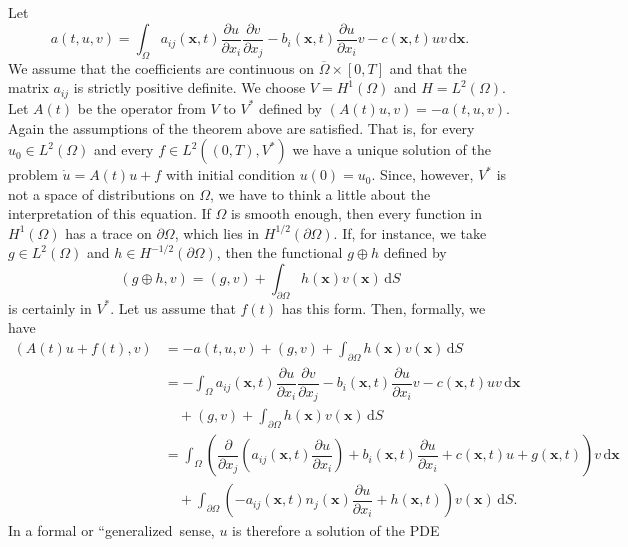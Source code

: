 \begin{Example}
\label{ex:parabolic-natural-boundary-problem}
Let
\begin{equation}\label{eq:parabolic-natural-boundary-quadratic-form}
a(t,u,v)=\int_\Omega a_{ij}(\bm{x},t)\dfrac{\partial u}{\partial x_i}\dfrac{\partial v}{\partial x_j}-b_i(\bm{x},t)\dfrac{\partial u}{\partial x_i}v-c(\bm{x},t)uv\,\mathrm{d}\bm{x}.
\end{equation}
We assume that the coefficients are continuous on $\overline\Omega\times[0,T]$ and that the matrix $a_{ij}$ is strictly positive definite. We choose $V=H^1(\Omega)$ and $H=L^2(\Omega)$. Let $A(t)$ be the operator from $V$ to $V^*$ defined by $(A(t)u,v)=-a(t,u,v)$. Again the assumptions of the theorem above are satisfied. That is, for every $u_0\in L^2(\Omega)$ and every $f\in L^2((0,T),V^*)$ we have a unique solution of the problem $\dot u=A(t)u+f$ with initial condition $u(0)=u_0$. Since, however, $V^*$ is not a space of distributions on $\Omega$, we have to think a little about the interpretation of this equation. If $\Omega$ is smooth enough, then every function in $H^1(\Omega)$ has a trace on $\partial\Omega$, which lies in $H^{1/2}(\partial\Omega)$. If, for instance, we take $g\in L^2(\Omega)$ and $h\in H^{-1/2}(\partial\Omega)$, then the functional $g\oplus h$ defined by
\begin{equation}\label{eq:parabolic-natural-boundary-sum-functional}
(g\oplus h,v)=(g,v)+\int_{\partial\Omega}h(\bm{x})v(\bm{x})\,\mathrm{d}S
\end{equation}
is certainly in $V^*$. Let us assume that $f(t)$ has this form. Then, formally, we have\[\begin{aligned}
(A(t)u+f(t),v)&=-a(t,u,v)+(g,v)+\int_{\partial\Omega}h(\bm{x})v(\bm{x})\,\mathrm{d}S\\
&=-\int_\Omega a_{ij}(\bm{x},t)\dfrac{\partial u}{\partial x_i}\dfrac{\partial v}{\partial x_j}-b_i(\bm{x},t)\dfrac{\partial u}{\partial x_i}v-c(\bm{x},t)uv\,\mathrm{d}\bm{x}\\
&\quad+(g,v)+\int_{\partial\Omega}h(\bm{x})v(\bm{x})\,\mathrm{d}S\\
&=\int_\Omega\left(\dfrac{\partial}{\partial x_j}\left(a_{ij}(\bm{x},t)\dfrac{\partial u}{\partial x_i}\right)+b_i(\bm{x},t)\dfrac{\partial u}{\partial x_i}+c(\bm{x},t)u+g(\bm{x},t)\right)v\,\mathrm{d}\bm{x}\\
&\quad+\int_{\partial\Omega}\left(-a_{ij}(\bm{x},t)n_j(\bm{x})\dfrac{\partial u}{\partial x_i}+h(\bm{x},t)\right)v(\bm{x})\,\mathrm{d}S.
\end{aligned}\]In a formal or ``generalized\textquotesingle\textquotesingle\ sense, $u$ is therefore a solution of the PDE

\end{Example}
